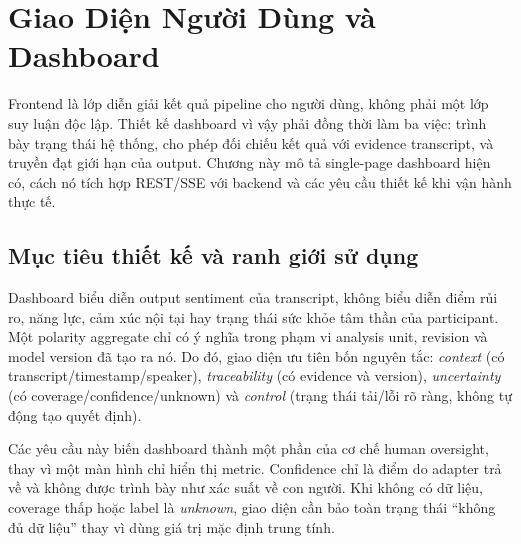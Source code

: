 \chapter{Giao Diện Người Dùng và Dashboard}
\label{chap:frontend}

Frontend là lớp diễn giải kết quả pipeline cho người dùng, không phải một lớp suy luận độc lập. Thiết kế dashboard vì vậy phải đồng thời làm ba việc: trình bày trạng thái hệ thống, cho phép đối chiếu kết quả với evidence transcript, và truyền đạt giới hạn của output. Chương này mô tả single-page dashboard hiện có, cách nó tích hợp REST/SSE với backend và các yêu cầu thiết kế khi vận hành thực tế.

\section{Mục tiêu thiết kế và ranh giới sử dụng}
Dashboard biểu diễn output sentiment của transcript, không biểu diễn điểm rủi ro, năng lực, cảm xúc nội tại hay trạng thái sức khỏe tâm thần của participant. Một polarity aggregate chỉ có ý nghĩa trong phạm vi analysis unit, revision và model version đã tạo ra nó. Do đó, giao diện ưu tiên bốn nguyên tắc: \emph{context} (có transcript/timestamp/speaker), \emph{traceability} (có evidence và version), \emph{uncertainty} (có coverage/confidence/unknown) và \emph{control} (trạng thái tải/lỗi rõ ràng, không tự động tạo quyết định).

Các yêu cầu này biến dashboard thành một phần của cơ chế human oversight, thay vì một màn hình chỉ hiển thị metric. Confidence chỉ là điểm do adapter trả về và không được trình bày như xác suất về con người. Khi không có dữ liệu, coverage thấp hoặc label là \textit{unknown}, giao diện cần bảo toàn trạng thái ``không đủ dữ liệu'' thay vì dùng giá trị mặc định trung tính.


